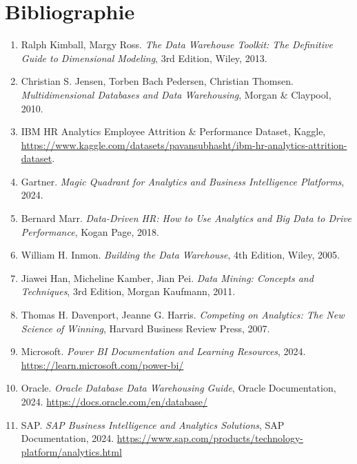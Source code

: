\chapter*{Bibliographie}

\begin{enumerate}

    \item Ralph Kimball, Margy Ross. \textit{The Data Warehouse Toolkit: The Definitive Guide to Dimensional Modeling}, 3rd Edition, Wiley, 2013.

    \item Christian S. Jensen, Torben Bach Pedersen, Christian Thomsen. \textit{Multidimensional Databases and Data Warehousing}, Morgan \& Claypool, 2010.

    \item IBM HR Analytics Employee Attrition \& Performance Dataset, Kaggle, 
    \url{https://www.kaggle.com/datasets/pavansubhasht/ibm-hr-analytics-attrition-dataset}.

    \item Gartner. \textit{Magic Quadrant for Analytics and Business Intelligence Platforms}, 2024.

    \item Bernard Marr. \textit{Data-Driven HR: How to Use Analytics and Big Data to Drive Performance}, Kogan Page, 2018.

    \item William H. Inmon. \textit{Building the Data Warehouse}, 4th Edition, Wiley, 2005.

    \item Jiawei Han, Micheline Kamber, Jian Pei. 
    \textit{Data Mining: Concepts and Techniques}, 3rd Edition, Morgan Kaufmann, 2011.

    \item Thomas H. Davenport, Jeanne G. Harris. 
    \textit{Competing on Analytics: The New Science of Winning}, Harvard Business Review Press, 2007.

    \item Microsoft. \textit{Power BI Documentation and Learning Resources}, 2024. 
    \url{https://learn.microsoft.com/power-bi/}

    \item Oracle. \textit{Oracle Database Data Warehousing Guide}, Oracle Documentation, 2024. 
    \url{https://docs.oracle.com/en/database/}

    \item SAP. \textit{SAP Business Intelligence and Analytics Solutions}, SAP Documentation, 2024. 
    \url{https://www.sap.com/products/technology-platform/analytics.html}


\end{enumerate}

